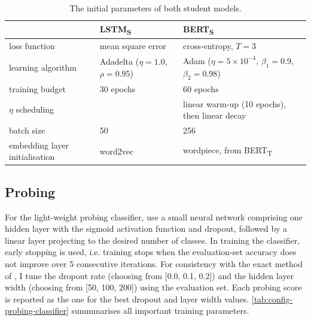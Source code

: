 \documentclass[bsc,frontabs,singlespacing,parskip,deptreport]{infthesis}
\def\BERTT{BERT\textsubscript{T}}
\def\BERTS{BERT\textsubscript{S}}
\def\LSTMS{LSTM\textsubscript{S}}
\begin{document}
{{{      \begin{table}[h!tb]
      \centering
      \begin{tabular}{m{}|m{}|m{}}
      & \LSTMS & \BERTS \\
      \hline
      loss function & mean square error & cross-entropy, $T=3$ \\
      \hline
      learning algorithm & Adadelta ($\eta=1.0$, $\rho=0.95$) &  Adam ($\eta=5\times10^{-4}$, $\beta_1=0.9$, $\beta_2=0.98$) \\
      \hline
      training budget & 30 epochs & 60 epochs \\
      \hline
      $\eta$ scheduling &  & linear warm-up (10 epochs), then linear decay \\
      \hline
      batch size & 50 & 256 \\
      \hline
      embedding layer initialisation & word2vec & wordpiece, from \BERTT \\
      \hline
      \end{tabular}
      \caption{The initial parameters of both student models.}
      \label{tab:initial-configs}
      \end{table}
    }

    \subsection{Probing}{
      \label{sec:implementation-details-probing}
      For the light-weight probing classifier, \citet{Conneau_2018} use a small neural network comprising one hidden layer with the sigmoid activation function and dropout, followed by a linear layer projecting to the desired number of classes. 
      In training the classifier, early stopping is used, i.e. training stops when the evaluation-set accuracy does not improve over 5 consecutive iterations.
      For consistency with the exact method of \citeauthor{Conneau_2018}, I tune the dropout rate (choosing from [0.0, 0.1, 0.2]) and the hidden layer width (choosing from [50, 100, 200]) using the evaluation set. Each probing score is reported as the one for the best dropout and layer width values.
      \autoref{tab:config-probing-classifier} summmarises all important training parameters.

}}}
\end{document}
